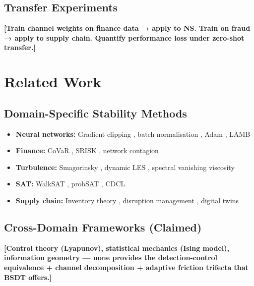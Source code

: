 \documentclass[11pt,a4paper]{article}
\begin{document}
\subsection{Transfer Experiments}
\textbf{[Train channel weights on finance data → apply to NS.
Train on fraud → apply to supply chain. Quantify performance loss
under zero-shot transfer.]}


\section{Related Work}\label{sec:related}

\subsection{Domain-Specific Stability Methods}
\begin{itemize}[nosep]
  \item \textbf{Neural networks:} Gradient clipping \cite{pascanu2013},
        batch normalisation \cite{ioffe2015}, Adam \cite{kingma2015},
        LAMB \cite{you2020lamb}
  \item \textbf{Finance:} CoVaR \cite{adrian2016covar},
        SRISK \cite{brownlees2017srisk},
        network contagion \cite{acemoglu2015systemic}
  \item \textbf{Turbulence:} Smagorinsky \cite{smagorinsky1963},
        dynamic LES \cite{germano1991},
        spectral vanishing viscosity \cite{tadmor1989}
  \item \textbf{SAT:} WalkSAT \cite{selman1994}, probSAT \cite{balint2012},
        CDCL \cite{silva1999grasp}
  \item \textbf{Supply chain:} Inventory theory \cite{zipkin2000},
        disruption management \cite{ivanov2017},
        digital twins \cite{ivanov2020supply}
\end{itemize}

\subsection{Cross-Domain Frameworks (Claimed)}
\textbf{[Control theory (Lyapunov), statistical mechanics
(Ising model), information geometry — none provides the
detection-control equivalence + channel decomposition + adaptive
friction trifecta that BSDT offers.]}
\end{document}
